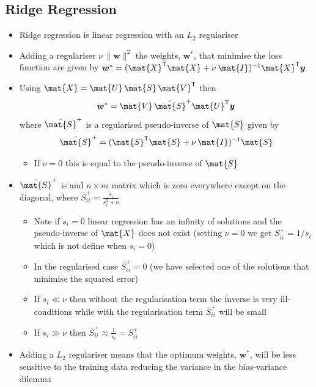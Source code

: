 \documentclass[11pt]{article}
\newcommand{\tr}{\textsf{T}}
\begin{document}
\subsection{Ridge Regression}
\label{sec:org9e2e354}
\begin{itemize}
\item Ridge regression is linear regression with an \(L_2\) regulariser
\item Adding a regulariser \(\nu\, \|\bm{w}\|^2\) the weights, \(\bm{w}^*\), that
minimise the loss function are given by \(\bm{w}^* =
     (\mat{X}^\tr\mat{X}+\nu\,\mat{I})^{-1}\mat{X}^\tr \bm{y}\)
\item Using \(\mat{X} = \mat{U}\,\mat{S}\,\mat{V}^\tr\) then
\begin{align*}
\bm{w}^* = \mat{V}\,\bar{\mat{S}}^+ \mat{U}^\tr \bm{y}
\end{align*}
where \(\bar{\mat{S}}^+\) is a regularised pseudo-inverse of \(\mat{S}\) given by
\begin{align*}
\bar{\mat{S}}^+ = (\mat{S}^\tr\mat{S}+\nu\,\mat{I})^{-1}\mat{S}
\end{align*}
\begin{itemize}
\item If \(\nu=0\) this is equal to the pseudo-inverse of \(\mat{S}\)
\end{itemize}
\item \(\bar{\mat{S}}^+\) is and \(n\times m\) matrix which is zero
everywhere except on the diagonal, where \(\bar{S}^+_{ii} = \frac{s_i}{s_i^2+\nu}\)
\begin{itemize}
\item Note if \(s_i=0\) linear regression has an infinity of solutions
and the pseudo-inverse of \(\mat{X}\) does not exist (setting
\(\nu=0\) we get \(S^+_{ii}=1/s_i\) which is not define when \(s_i=0\))
\item In the regularised case \(\bar{S}^+_{ii} = 0\) (we have selected
one of the solutions that minimise the squared error)
\item If \(s_i\ll\nu\) then without the regularisation term the inverse is
very ill-conditions while with the regularisation term
\(\bar{S}^+_{ii}\) will be small
\item If \(s_i\gg\nu\) then \(\bar{S}^+_{ii} \approx \frac{1}{s_i} = S^+_{ii}\)
\end{itemize}
\item Adding a \(L_2\) regulariser means that the optimum weights,
\(\bm{w}^*\), will be less sensitive to the training data reducing
the variance in the bias-variance dilemma
\end{itemize}
\end{document}
